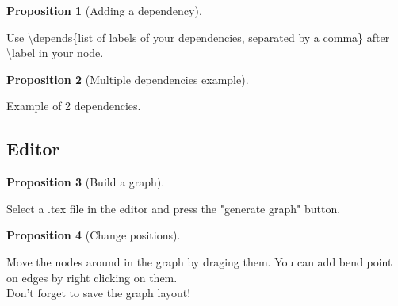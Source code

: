 \documentclass{article}
\theoremstyle{definition}
\newtheorem{proposition}{Proposition}
\newcommand{\depends}[1]{}
\newcommand{\summary}[1]{}
\newcommand{\mainText}[1]{#1}
\begin{document}
\begin{proposition}[Adding a dependency]
    \label{prop:add-dependency}
    \depends{prop:create-node}
    \summary{
        Use \textbackslash depends\{list of labels of your dependencies, separated by a comma\} after \textbackslash label in your node.
    }
    \mainText{
        Use \textbackslash depends\{list of labels of your dependencies, separated by a comma\} after \textbackslash label in your node.
    }
\end{proposition}

\begin{proposition}[Multiple dependencies example]
    \label{prop:multi-dep}
    \depends{prop:create-node,prop:add-dependency}
    \summary{
        Example of 2 dependencies.
    }
    \mainText{
        Example of 2 dependencies.
    }
\end{proposition}

\subsection{Editor}
\label{subsec:editor}

\begin{proposition}[Build a graph]
    \label{prop:build-a-graph}
    \summary{
        Select a .tex file in the editor and press the "generate graph" button. The graph is saved in a different file: graph_with_pos_TEX_FILENAME.txt. It containes the position of the nodes.
    }
    \mainText{
        Select a .tex file in the editor and press the "generate graph" button.
    }
\end{proposition}

\begin{proposition}[Change positions]
    \label{prop:change-pos}
    \depends{prop:build-a-graph}
    \summary{
        Move the nodes around in the graph by draging them. You can add bend point on edges by right clicking on them.\\
        Don't forget to save the graph layout! 
    }
    \mainText{
        Move the nodes around in the graph by draging them. You can add bend point on edges by right clicking on them.\\
        Don't forget to save the graph layout! 
    }
\end{proposition}
\end{document}
